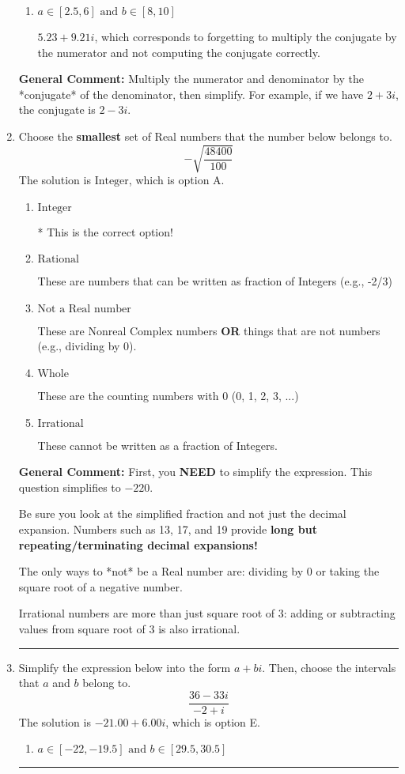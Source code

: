 \documentclass{extbook}[14pt]
\newcommand{\litem}[1]{\item #1

\rule{\textwidth}{0.4pt}}
\begin{document}
\begin{enumerate}
{\begin{enumerate}[label=\Alph*.]
 $-493.00  - 5.06 i$, which corresponds to forgetting to multiply the conjugate by the numerator and using a plus instead of a minus in the denominator.
\item \( a \in [2.5, 6] \text{ and } b \in [8, 10] \)

 $5.23  + 9.21 i$, which corresponds to forgetting to multiply the conjugate by the numerator and not computing the conjugate correctly.
\end{enumerate}

\textbf{General Comment:} Multiply the numerator and denominator by the *conjugate* of the denominator, then simplify. For example, if we have $2+3i$, the conjugate is $2-3i$.
}
\litem{
Choose the \textbf{smallest} set of Real numbers that the number below belongs to.
\[ -\sqrt{\frac{48400}{100}} \]The solution is \( \text{Integer} \), which is option A.\begin{enumerate}[label=\Alph*.]
\item \( \text{Integer} \)

* This is the correct option!
\item \( \text{Rational} \)

These are numbers that can be written as fraction of Integers (e.g., -2/3)
\item \( \text{Not a Real number} \)

These are Nonreal Complex numbers \textbf{OR} things that are not numbers (e.g., dividing by 0).
\item \( \text{Whole} \)

These are the counting numbers with 0 (0, 1, 2, 3, ...)
\item \( \text{Irrational} \)

These cannot be written as a fraction of Integers.
\end{enumerate}

\textbf{General Comment:} First, you \textbf{NEED} to simplify the expression. This question simplifies to $-220$. 
 
 Be sure you look at the simplified fraction and not just the decimal expansion. Numbers such as 13, 17, and 19 provide \textbf{long but repeating/terminating decimal expansions!} 
 
 The only ways to *not* be a Real number are: dividing by 0 or taking the square root of a negative number. 
 
 Irrational numbers are more than just square root of 3: adding or subtracting values from square root of 3 is also irrational.
}
\litem{
Simplify the expression below into the form $a+bi$. Then, choose the intervals that $a$ and $b$ belong to.
\[ \frac{36 - 33 i}{-2 + i} \]The solution is \( -21.00  + 6.00 i \), which is option E.\begin{enumerate}[label=\Alph*.]
\item \( a \in [-22, -19.5] \text{ and } b \in [29.5, 30.5] \)


\end{enumerate}}
\end{enumerate}
\end{document}
